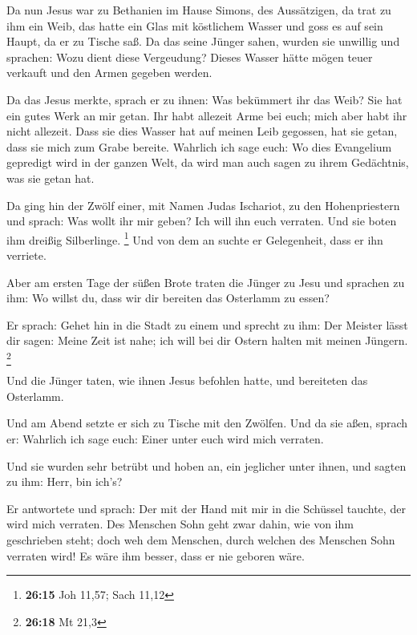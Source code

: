 Da nun Jesus war zu Bethanien im Hause Simons, des
Aussätzigen,  da trat zu ihm ein Weib, das hatte ein Glas
mit köstlichem Wasser und goss es auf sein Haupt, da er zu Tische saß.
 Da das seine Jünger sahen, wurden sie unwillig und
sprachen: Wozu dient diese Vergeudung?  Dieses Wasser hätte
mögen teuer verkauft und den Armen gegeben werden.

 Da das Jesus merkte, sprach er zu ihnen: Was bekümmert ihr
das Weib? Sie hat ein gutes Werk an mir getan.  Ihr habt
allezeit Arme bei euch; mich aber habt ihr nicht allezeit. 
Dass sie dies Wasser hat auf meinen Leib gegossen, hat sie getan, dass
sie mich zum Grabe bereite.  Wahrlich ich sage euch: Wo
dies Evangelium gepredigt wird in der ganzen Welt, da wird man auch
sagen zu ihrem Gedächtnis, was sie getan hat.

 Da ging hin der Zwölf einer, mit Namen Judas Ischariot, zu
den Hohenpriestern  und sprach: Was wollt ihr mir geben?
Ich will ihn euch verraten. Und sie boten ihm dreißig Silberlinge.
\footnote{\textbf{26:15} Joh 11,57; Sach 11,12}  Und von
dem an suchte er Gelegenheit, dass er ihn verriete.

 Aber am ersten Tage der süßen Brote traten die Jünger zu
Jesu und sprachen zu ihm: Wo willst du, dass wir dir bereiten das
Osterlamm zu essen?

 Er sprach: Gehet hin in die Stadt zu einem und sprecht zu
ihm: Der Meister lässt dir sagen: Meine Zeit ist nahe; ich will bei dir
Ostern halten mit meinen Jüngern. \footnote{\textbf{26:18} Mt 21,3}

 Und die Jünger taten, wie ihnen Jesus befohlen hatte, und
bereiteten das Osterlamm.

 Und am Abend setzte er sich zu Tische mit den Zwölfen.
 Und da sie aßen, sprach er: Wahrlich ich sage euch: Einer
unter euch wird mich verraten.

 Und sie wurden sehr betrübt und hoben an, ein jeglicher
unter ihnen, und sagten zu ihm: Herr, bin ich's?

 Er antwortete und sprach: Der mit der Hand mit mir in die
Schüssel tauchte, der wird mich verraten.  Des Menschen
Sohn geht zwar dahin, wie von ihm geschrieben steht; doch weh dem
Menschen, durch welchen des Menschen Sohn verraten wird! Es wäre ihm
besser, dass er nie geboren wäre.

